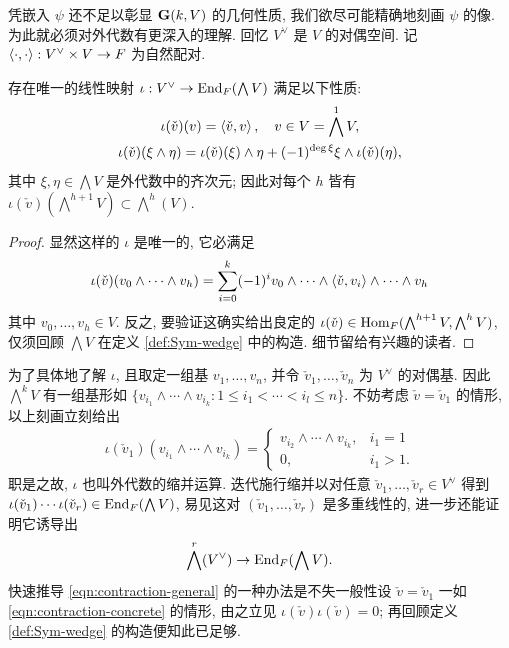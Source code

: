 凭嵌入 $\psi$ 还不足以彰显 $\mathbf{G}(k, V)$ 的几何性质, 我们欲尽可能精确地刻画 $\psi$ 的像. 为此就必须对外代数有更深入的理解. 回忆 $V^\vee$ 是 $V$ 的对偶空间. 记 $\left\langle \cdot, \cdot \right\rangle: V^\vee \times V \to F$ 为自然配对.
\begin{definition-theorem}\label{def:wedge-contraction}
	存在唯一的线性映射 $\iota: V^\vee \to \operatorname{End}_F( \bigwedge V)$ 满足以下性质:
	\begin{gather*}
		\iota(\check{v})(v) = \left\langle \check{v}, v \right\rangle, \quad v \in V = \bigwedge^1 V, \\
		\iota(\check{v})(\xi \wedge \eta) = \iota(\check{v})(\xi) \wedge \eta + (-1)^{\deg \xi} \xi \wedge \iota(\check{v})(\eta),
	\end{gather*}
	其中 $\xi, \eta \in \bigwedge V$ 是外代数中的齐次元; 因此对每个 $h$ 皆有 $\iota(\check{v})(\bigwedge^{h+1} V) \subset \bigwedge^h(V)$.
\end{definition-theorem}
\begin{proof}
	显然这样的 $\iota$ 是唯一的, 它必满足
	\[ \iota(\check{v})(v_0 \wedge \cdots \wedge v_h) = \sum_{i=0}^k (-1)^i v_0 \wedge \cdots \wedge \left\langle \check{v}, v_i \right\rangle \wedge \cdots \wedge v_h \]
	其中 $v_0, \ldots, v_h \in V$. 反之, 要验证这确实给出良定的 $\iota(\check{v}) \in \operatorname{Hom}_F( \bigwedge^{h+1} V, \bigwedge^h V)$, 仅须回顾 $\bigwedge V$ 在定义 \ref{def:Sym-wedge} 中的构造. 细节留给有兴趣的读者.
\end{proof}
为了具体地了解 $\iota$, 且取定一组基 $v_1, \ldots, v_n$, 并令 $\check{v}_1, \ldots, \check{v}_n$ 为 $V^\vee$ 的对偶基. 因此 $\bigwedge^k V$ 有一组基形如 $\{ v_{i_1} \wedge \cdots \wedge v_{i_k}: 1 \leq i_1 < \cdots < i_l \leq n \}$. 不妨考虑 $\check{v} = \check{v}_1$ 的情形, 以上刻画立刻给出
\begin{gather}\label{eqn:contraction-concrete}
	\iota(\check{v}_1)(v_{i_1} \wedge \cdots \wedge v_{i_k}) = \begin{cases}
		v_{i_2} \wedge \cdots \wedge v_{i_k}, & i_1 = 1 \\
		0, & i_1 > 1. 
\end{cases}\end{gather}
职是之故, $\iota$ 也叫外代数的缩并运算. 迭代施行缩并以对任意 $\check{v}_1, \ldots, \check{v}_r \in V^\vee$ 得到 $\iota(\check{v}_1) \cdots \iota(\check{v}_r) \in \operatorname{End}_F(\bigwedge V)$, 易见这对 $(\check{v}_1, \ldots, \check{v}_r)$ 是多重线性的, 进一步还能证明它诱导出
\begin{equation}\label{eqn:contraction-general}
	\bigwedge^r(V^\vee) \to \operatorname{End}_F(\bigwedge V).
\end{equation}	
快速推导 \eqref{eqn:contraction-general} 的一种办法是不失一般性设 $\check{v} = \check{v}_1$ 一如 \eqref{eqn:contraction-concrete} 的情形, 由之立见 $\iota(\check{v}) \iota(\check{v})=0$; 再回顾定义 \ref{def:Sym-wedge} 的构造便知此已足够.

